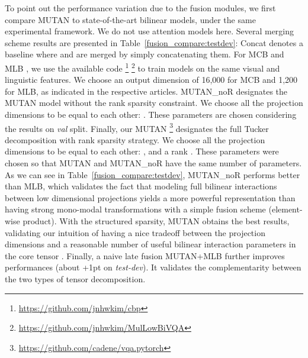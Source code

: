 \documentclass[10pt,twocolumn,letterpaper]{article}
\begin{document}
To point out the performance variation due to the fusion modules, we first compare MUTAN to state-of-the-art bilinear models, under the same experimental framework. 
We do not use attention models here. 
Several merging scheme results are presented in Table~\ref{fusion_compare:testdev}: Concat denotes a baseline where  and  are merged by simply concatenating them. For MCB \cite{fukui16mcb} and MLB \cite{Kim2017}, we use the available code \footnote{\url{https://github.com/jnhwkim/cbp}} \footnote{\url{https://github.com/jnhwkim/MulLowBiVQA}} to train models on the same visual and linguistic features. We choose an output dimension of 16,000 for MCB and 1,200 for MLB, as indicated in the respective articles. MUTAN\_noR designates the MUTAN model without the rank sparsity constraint. We choose all the projection dimensions to be equal to each other: . These parameters are chosen considering the results on \textit{val} split. Finally, our MUTAN \footnote{\url{https://github.com/cadene/vqa.pytorch}} designates the full Tucker decomposition with rank sparsity strategy. We choose all the projection dimensions to be equal to each other: , and a rank . These parameters were chosen so that MUTAN and MUTAN\_noR have the same number of parameters.
 As we can see in Table~\ref{fusion_compare:testdev}, MUTAN\_noR performs better than MLB, which validates the fact that modeling full bilinear interactions between low dimensional projections yields a more powerful representation than having strong mono-modal transformations with a simple fusion scheme (element-wise product). With the structured sparsity, MUTAN obtains the best results, validating our intuition of having a nice tradeoff between the projection dimensions and a reasonable number of useful bilinear interaction parameters in the core tensor .
Finally, a naive late fusion MUTAN+MLB further improves performances (about +1pt on {\em test-dev}). It validates the complementarity between the two types of tensor decomposition. 
\end{document}
